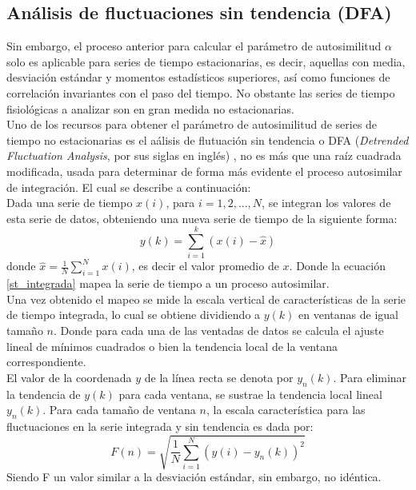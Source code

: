 \documentclass[letterpaper,titlepage,12pt,draft]{report}
\begin{document}
\subsection{An\'alisis de fluctuaciones sin tendencia (DFA)}

Sin embargo, el proceso anterior para calcular el par\'ametro de autosimilitud $\alpha$ solo es aplicable para series de tiempo estacionarias, es decir, aquellas con media, desviaci\'on est\'andar y momentos estad\'isticos superiores, as\'i como funciones de correlaci\'on invariantes con el paso del tiempo. No obstante las series de tiempo fisiol\'ogicas a analizar son en gran medida no estacionarias.\\

Uno de los recursos para obtener el par\'ametro de autosimilitud de series de tiempo no estacionarias es el a\'alisis de flutuaci\'on sin tendencia o DFA (\textit{Detrended Fluctuation Analysis}, por sus siglas en ingl\'es) \cite{Peng}, no es m\'as que una ra\'iz cuadrada modificada, usada para determinar de forma m\'as evidente el proceso autosimilar de integraci\'on. %
El cual se describe a continuaci\'on:\\

Dada una serie de tiempo $x(i)$, para $i=1,2,...,N$, se integran los valores de esta serie de datos, obteniendo una nueva serie de tiempo de la siguiente forma: 
\begin{equation}
\displaystyle y(k)=\sum_{i=1}^{k}(x(i)-\hat{x}) \label{st_integrada}
\end{equation}
donde $\displaystyle \hat{x}=\frac{1}{N} \sum_{i=1}^N x(i)$, es decir el valor promedio de $x$. Donde la ecuaci\'on \eqref{st_integrada} mapea la serie de tiempo a un proceso autosimilar.\\

Una vez obtenido el mapeo se mide la escala vertical de caracter\'isticas de la serie de tiempo integrada, lo cual se obtiene dividiendo a $y(k)$ en ventanas de igual tama\~no $n$. Donde para cada una de las ventadas de datos se calcula el ajuste lineal de m\'inimos cuadrados o bien la tendencia local de la ventana correspondiente.\\

El valor de la coordenada $y$ de la l\'inea recta se denota por $y_n(k)$. Para eliminar la tendencia de $y(k)$ para cada ventana, se sustrae la tendencia local lineal $y_n(k)$. Para cada tama\~no de ventana $n$, la escala caracter\'istica para las fluctuaciones en la serie integrada y sin tendencia es dada por:
\begin{equation}
F(n)=\sqrt{\frac{1}{N}\sum_{i=1}^{N}(y(i)-y_n(k))^2} \label{Sin_Tendencia}
\end{equation}
Siendo F un valor similar a la desviaci\'on est\'andar, sin embargo, no id\'entica.\\
\end{document}
